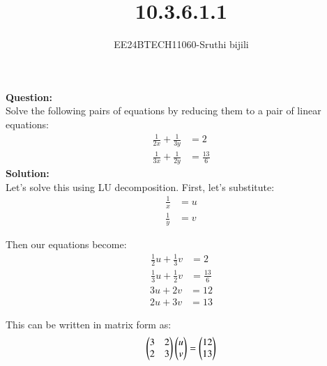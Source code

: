 \documentclass[journal]{IEEEtran}
\begin{document}

\vspace{3cm}

\title{10.3.6.1.1}
\author{EE24BTECH11060-Sruthi bijili}
{\let\newpage\relax\maketitle}
\textbf{Question:}\\
Solve the following pairs of equations by reducing them to a pair of linear equations:
\begin{align*}
    \frac{1}{2x} + \frac{1}{3y} &= 2\\
    \frac{1}{3x} + \frac{1}{2y} &= \frac{13}{6}
\end{align*}
\textbf{Solution:}\\
Let's solve this using LU decomposition. First, let's substitute:
\begin{align}
    \frac{1}{x} &= u\\
    \frac{1}{y} &= v
\end{align}

Then our equations become:
\begin{align}
    \frac{1}{2}u + \frac{1}{3}v &= 2 \label{eq1}\\
    \frac{1}{3}u + \frac{1}{2}v &= \frac{13}{6} \label{eq2}
\end{align}
\begin{align}
    3u + 2v &= 12 \label{eq1}\\
    2u + 3v &= 13 \label{eq2}
\end{align}


This can be written in matrix form as:
\begin{align}
    \begin{pmatrix}3 & 2 \\ 2& 3\end{pmatrix}\begin{pmatrix}u\\v\end{pmatrix} = \begin{pmatrix}12\\13\end{pmatrix}
\end{align}
\end{document}
